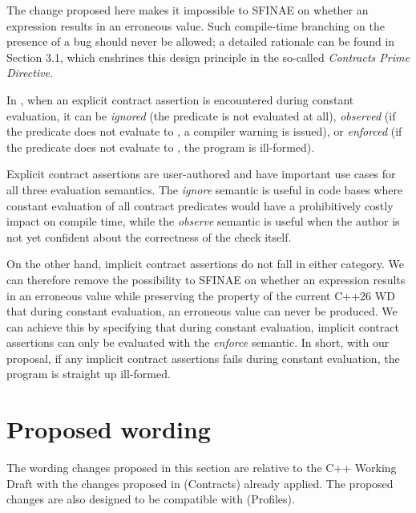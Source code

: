 The change proposed here makes it impossible to SFINAE on whether an expression results in an erroneous value. Such compile-time branching on the presence of a bug should never be allowed; a detailed rationale can be found in \cite{P2900R13} Section 3.1, which enshrines this design principle in the so-called \emph{Contracts Prime Directive}.

In \cite{P2900R13}, when an explicit contract assertion is encountered during constant evaluation, it can be \emph{ignored} (the predicate is not evaluated at all), \emph{observed} (if the predicate does not evaluate to , a compiler warning is issued), or \emph{enforced} (if the predicate does not evaluate to , the program is ill-formed).

Explicit contract assertions are user-authored and have important use cases for all three evaluation semantics. The \emph{ignore} semantic is useful in code bases where constant evaluation of all contract predicates would have a prohibitively costly impact on compile time, while the \emph{observe} semantic is useful when the author is not yet confident about the correctness of the check itself.

On the other hand, implicit contract assertions do not fall in either category. We can therefore remove the possibility to SFINAE on whether an expression results in an erroneous value while preserving the property of the current C++26 WD that during constant evaluation, an erroneous value can never be produced. We can achieve this by specifying that during constant evaluation, implicit contract assertions can only be evaluated with the \emph{enforce} semantic. In short, with our proposal, if any implicit contract assertions fails during constant evaluation, the program is straight up ill-formed.

\section{Proposed wording}

The wording changes proposed in this section are relative to the C++ Working Draft \cite{N5001} with the changes proposed in \cite{P2900R13} (Contracts) already applied. The proposed changes are also designed to be compatible with \cite{P3081R1} (Profiles).


